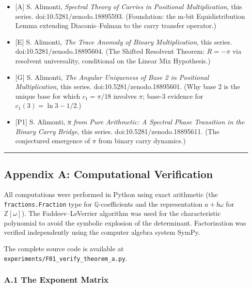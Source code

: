 \documentclass[
  11pt,
]{article}
\providecommand{\tightlist}{%
  \setlength{\itemsep}{0pt}\setlength{\parskip}{0pt}}
\begin{document}
\begin{itemize}
\tightlist
\item
  {[}A{]} S. Alimonti, \emph{Spectral Theory of Carries in Positional
  Multiplication}, this series. doi:10.5281/zenodo.18895593. (Foundation: the
  m-bit Equidistribution Lemma extending Diaconis--Fulman to the carry transfer
  operator.)
\item
  {[}E{]} S. Alimonti, \emph{The Trace Anomaly of Binary Multiplication}, this
  series. doi:10.5281/zenodo.18895604. (The Shifted Resolvent Theorem:
  \(R = -\pi\) via resolvent universality, conditional on the Linear Mix
  Hypothesis.)
\item
  {[}G{]} S. Alimonti, \emph{The Angular Uniqueness of Base 2 in Positional
  Multiplication}, this series. doi:10.5281/zenodo.18895601. (Why base 2 is the
  unique base for which \(c_1 = \pi/18\) involves \(\pi\); base-3 evidence for
  \(c_1(3) = \ln 3 - 1/2\).)
\item
  {[}P1{]} S. Alimonti, \emph{π from Pure Arithmetic: A Spectral Phase
  Transition in the Binary Carry Bridge}, this series.
  doi:10.5281/zenodo.18895611. (The conjectured emergence of \(\pi\) from binary
  carry dynamics.)
\end{itemize}

\begin{center}\rule{0.5\linewidth}{0.5pt}\end{center}

\newpage

\subsection{Appendix A: Computational
Verification}\label{appendix-a-computational-verification}

All computations were performed in Python using exact arithmetic (the
\texttt{fractions.Fraction} type for \(\mathbb{Q}\)-coefficients and the
representation \(a + b\omega\) for \(\mathbb{Z}[\omega]\)). The
Faddeev--LeVerrier algorithm was used for the characteristic polynomial to avoid
the symbolic explosion of the determinant. Factorization was verified
independently using the computer algebra system SymPy.

The complete source code is available at
\texttt{experiments/F01\_verify\_theorem\_a.py}.

\subsubsection{A.1 The Exponent Matrix}\label{a.1-the-exponent-matrix}
\end{document}
